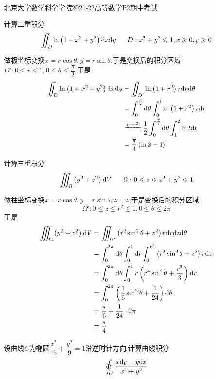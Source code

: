 \documentclass{ctexart}
\begin{document}
\pagestyle{empty}
\begin{center}\Large
    北京大学数学科学学院2021-22高等数学B2期中考试
\end{center}
\begin{problem}[1.(10\songti{分})]
    计算二重积分
    \[\iint_{D}\ln\left(1+x^2+y^2\right)\dx\di y\ \ \ \ \ D:x^2+y^2\leqslant1,x\geqslant0,y\geqslant0\]
\end{problem}
\begin{solution}
    做极坐标变换$x=r\cos\theta,y=r\sin\theta$.于是变换后的积分区域$D':0\leqslant r\leqslant 1,0\leqslant\theta\leqslant\dfrac\pi2$.于是
    \[\begin{aligned}
        \iint_{D}\ln\left(1+x^2+y^2\right)\dx\di y
        &= \iint_{D'}\ln\left(1+r^2\right)r\di r\di\theta \\
        &= \int_0^{\frac\pi2}\di\theta\int_0^1\ln\left(1+r^2\right)r\di r \\
        &\xlongequal{t=r^2} \dfrac12\int_0^{\frac\pi2}\di\theta\int_1^2\ln t\di t \\
        &= \dfrac\pi4\left(\ln 2-1\right)
    \end{aligned}\]
\end{solution}
\begin{problem}[2.(10\songti{分})]
    计算三重积分
    \[\iiint_{\Omega}\left(y^2+z^2\right)\di V\ \ \ \ \ \Omega:0\leqslant z\leqslant x^2+y^2\leqslant1\]
\end{problem}
\begin{solution}
    做柱坐标变换$x=r\cos\theta,y=r\sin\theta,z=z$,于是变换后的积分区域
    \[\Omega':0\leqslant z\leqslant r^2\leqslant 1,0\leqslant \theta\leqslant 2\pi\]
    于是
    \[\begin{aligned}
        \iiint_{\Omega}\left(y^2+z^2\right)\mathrm{d} V
        &= \iiint_{\Omega'}\left(r^2\sin^2\theta+z^2\right)r\mathrm{d} r\mathrm{d} z\mathrm{d}\theta \\
        &= \int_0^{2\pi}\mathrm{d}\theta\int_0^1\mathrm{d} r\int_0^{r^2}\left(r^2\sin^2\theta+z^2\right)r\mathrm{d} z \\
        &= \int_0^{2\pi}\mathrm{d}\theta\int_0^1r\left(r^4\sin^2\theta+\dfrac{r^6}{3}\right)\mathrm{d} r\\
        &= \int_0^{2\pi}\left(\dfrac16\sin^2\theta+\dfrac1{24}\right)\mathrm{d}\theta\\
        &= \dfrac\pi6+\dfrac1{24}\cdot2\pi \\
        &= \dfrac\pi4
    \end{aligned}\]
\end{solution}
\begin{problem}[3.(10\songti{分})]
    设曲线$C$为椭圆$\dfrac{x^2}{16}+\dfrac{y^2}{9}=1$沿逆时针方向.计算曲线积分
    \[\oint_{C}\dfrac{x\mathrm{d} y-y\mathrm{d} x}{x^2+y^2}\]
\end{problem}
\end{document}
